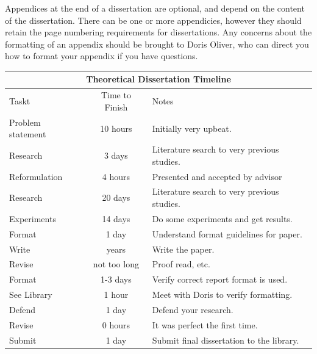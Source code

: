 \documentclass[12pt]{report}
\begin{document}
\noindent Appendices at the end of a dissertation are optional, and depend on the content of the dissertation. There can be one or more appendicies, however they should retain the page numbering requirements for dissertations.  Any concerns about the formatting of an appendix should be brought to Doris Oliver, who can direct you how to format your appendix if you have questions.

\begin{center}
\begin{tabular}{|l|c|p{3.0in}|}
\hline
\multicolumn{3}{|c|}{Theoretical Dissertation Timeline}\\ \hline
Taskt&Time to Finish&Notes\\ \hline
Problem statement&10 hours&Initially very upbeat.\\ \hline
Research&3 days&Literature search to very previous studies.\\ \hline
Reformulation&4 hours&Presented and accepted by advisor\\ \hline
Research&20 days&Literature search to very previous  studies.\\ \hline
Experiments&14 days&Do some experiments and get results.\\ \hline
Format&1 day&Understand format guidelines for paper.\\ \hline
Write&years&Write the paper.\\ \hline
Revise&not too long&Proof read, etc.\\ \hline
Format&1-3 days&Verify correct report format is used.\\ \hline
See Library&1 hour&Meet with Doris to verify formatting.\\ \hline
Defend&1 day&Defend your research.\\ \hline
Revise&0 hours&It was perfect the first time.\\ \hline
Submit&1 day&Submit final dissertation to the library.\\ \hline
\end{tabular}
\end{center} 


%
%
% 
%


\newpage
{}		%

\end{document}
